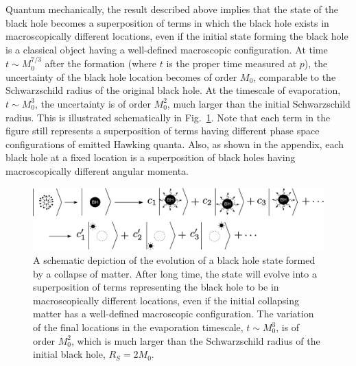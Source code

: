 \documentclass[12pt]{article}
\begin{document}
Quantum mechanically, the result described above implies that the state 
of the black hole becomes a superposition of terms in which the black 
hole exists in macroscopically different locations, even if the initial 
state forming the black hole is a classical object having a well-defined 
macroscopic configuration.  At time $t \sim M_0^{7/3}$ after the formation 
(where $t$ is the proper time measured at $p$), the uncertainty of the 
black hole location becomes of order $M_0$, comparable to the Schwarzschild 
radius of the original black hole.  At the timescale of evaporation, 
$t \sim M_0^3$, the uncertainty is of order $M_0^2$, much larger than 
the initial Schwarzschild radius.  This is illustrated schematically 
in Fig.~\ref{fig:evap}.  Note that each term in the figure still 
represents a superposition of terms having different phase space 
configurations of emitted Hawking quanta.  Also, as shown in the 
appendix, each black hole at a fixed location is a superposition 
of black holes having macroscopically different angular momenta.
%
\begin{figure}[t]
\begin{center}
  \includegraphics[width=16cm]{figure/evaporation.eps}
\caption{A schematic depiction of the evolution of a black hole state 
 formed by a collapse of matter.  After long time, the state will evolve 
 into a superposition of terms representing the black hole to be in 
 macroscopically different locations, even if the initial collapsing 
 matter has a well-defined macroscopic configuration.  The variation of 
 the final locations in the evaporation timescale, $t \sim M_0^3$, is 
 of order $M_0^2$, which is much larger than the Schwarzschild radius 
 of the initial black hole, $R_S = 2M_0$.}
\label{fig:evap}
\end{center}
\end{figure}
%
\end{document}
